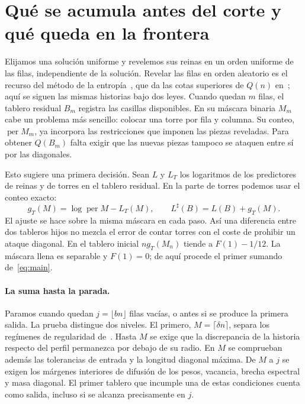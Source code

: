 \section{Qué se acumula antes del corte y qué queda en la frontera}\label{sec:signedmap}
Elijamos una solución uniforme y revelemos sus reinas en un orden uniforme de las filas,
independiente de la solución. Revelar las filas en orden aleatorio es el recurso del método de la
entropía~\cite{rad,ll}, que da las cotas superiores de \(Q(n)\) en~\cite{luria,simkin}; aquí se siguen
las mismas historias bajo dos leyes. Cuando quedan \(m\) filas, el tablero residual \(B_m\) registra las
casillas disponibles. En su máscara binaria \(M_m\) cabe un problema más sencillo: colocar una
torre por fila y columna. Su conteo, \(\operatorname{per}M_m\), ya incorpora las restricciones
que imponen las piezas reveladas. Para obtener \(Q(B_m)\) falta exigir que las nuevas piezas
tampoco se ataquen entre sí por las diagonales.

Esto sugiere una primera decisión. Sean \(L\) y \(L_T\) los logaritmos de los predictores de reinas
y de torres en el tablero residual. En la parte de torres podemos usar el conteo exacto:
\[
 g_T(M)=\log\operatorname{per}M-L_T(M),\qquad L^\sharp(B)=L(B)+g_T(M).
\]
El ajuste se hace sobre la misma máscara en cada paso. Así una diferencia entre dos tableros hijos
no mezcla el error de contar torres con el coste de prohibir un ataque diagonal. En el tablero
inicial \(n g_T(M_n)\) tiende a \(F(1)-1/12\). La máscara llena es separable y \(F(1)=0\); de
aquí procede el primer sumando de~\eqref{eq:main}.

\paragraph{La suma hasta la parada.}
Paramos cuando quedan \(j=\lfloor bn\rfloor\) filas vacías, o antes si se produce la primera
salida. La prueba distingue dos niveles. El primero, \(M=\lceil\delta n\rceil\), separa los
regímenes de regularidad de~\cite[Definición~2.2 y \S5.4]{tc}. Hasta \(M\) se exige que la
discrepancia de la historia respecto del perfil permanezca por debajo de su radio. En \(M\) se
comprueban además las tolerancias de entrada y la longitud diagonal máxima. De \(M\) a \(j\)
se exigen los márgenes interiores de difusión de los pesos, vacancia, brecha espectral y masa
diagonal. El primer tablero que incumple una de estas condiciones cuenta como salida, incluso
si se alcanza precisamente en \(j\).

